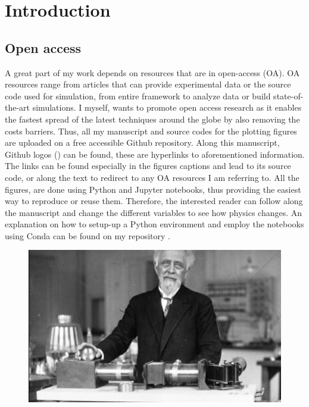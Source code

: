 \section{Introduction}
  \label{sec:Intro}




\subsection{Open access}

A great part of my work depends on resources that are in open-access (OA). OA resources range from articles that can provide experimental data or the source code used for simulation, from entire framework to analyze data or build state-of-the-art simulations. I myself, wants to promote open access research as it enables the fastest spread of the latest techniques around the globe by also removing the costs barriers. Thus, all my manuscript and source codes for the plotting figures are uploaded on a free accessible Github repository. Along this manuscript, Github logos (\href{https://github.com/eXpensia/Ma-these/}{\faGithub}) can be found, these are hyperlinks to aforementioned information. The links can be found especially in the figures captions and lead to its source code, or along the text to redirect to any OA resources I am referring to. All the figures, are done using Python and Jupyter notebooks, thus providing the easiest way to reproduce or reuse them. Therefore, the interested reader can follow along the manuscript and change the different variables to see how physics changes.  An explanation on how to setup-up a Python environment and employ the notebooks using Conda can be found on my repository \href{https://github.com/eXpensia/Ma-these/}{\faGithub}.


\vspace{4cm}

\begin{figure}[h]
	\begin{center}
		\includegraphics[width=16cm]{02_body/introduction/image/perrin.jpg}
	\end{center}
\end{figure}